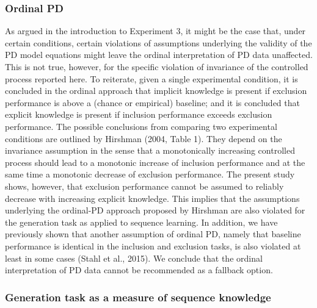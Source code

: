 \documentclass[floatsintext,man]{apa6}
\begin{document}
\subsubsection{Ordinal PD}\label{ordinal-pd}

As argued in the introduction to Experiment 3, it might be the case
that, under certain conditions, certain violations of assumptions
underlying the validity of the PD model equations might leave the
ordinal interpretation of PD data unaffected. This is not true, however,
for the specific violation of invariance of the controlled process
reported here. To reiterate, given a single experimental condition, it
is concluded in the ordinal approach that implicit knowledge is present
if exclusion performance is above a (chance or empirical) baseline; and
it is concluded that explicit knowledge is present if inclusion
performance exceeds exclusion performance. The possible conclusions from
comparing two experimental conditions are outlined by Hirshman (2004,
Table 1). They depend on the invariance assumption in the sense that a
monotonically increasing controlled process should lead to a monotonic
increase of inclusion performance and at the same time a monotonic
decrease of exclusion performance. The present study shows, however,
that exclusion performance cannot be assumed to reliably decrease with
increasing explicit knowledge. This implies that the assumptions
underlying the ordinal-PD approach proposed by Hirshman are also
violated for the generation task as applied to sequence learning. In
addition, we have previously shown that another assumption of ordinal
PD, namely that baseline performance is identical in the inclusion and
exclusion tasks, is also violated at least in some cases (Stahl et al.,
2015). We conclude that the ordinal interpretation of PD data cannot be
recommended as a fallback option.

\subsubsection{Generation task as a measure of sequence
knowledge}\label{generation-task-as-a-measure-of-sequence-knowledge}
\end{document}
